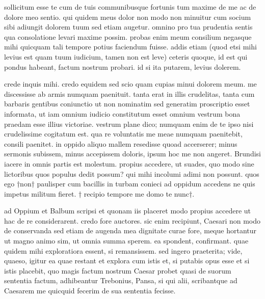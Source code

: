 


 sollicitum esse te cum de tuis communibusque fortunis tum maxime de me ac de dolore meo sentio. qui quidem meus dolor non modo non minuitur cum socium sibi adiungit dolorem tuum sed etiam augetur. omnino pro tua prudentia sentis qua consolatione levari maxime possim. probas enim meum consilium negasque mihi quicquam tali tempore potius faciendum fuisse. addis etiam (quod etsi mihi levius est quam tuum iudicium, tamen non est leve) ceteris quoque, id est qui pondus habeant, factum nostrum probari. id si ita putarem, levius dolerem.

 crede inquis mihi. credo equidem sed scio quam cupias minui dolorem meum. me discessisse ab armis numquam paenituit. tanta erat in illis crudelitas, tanta cum barbaris gentibus coniunctio ut non nominatim sed generatim proscriptio esset informata, ut iam omnium iudicio constitutum esset omnium vestrum bona praedam esse illius victoriae. vestrum plane dico; numquam enim de te ipso nisi crudelissime cogitatum est. qua re voluntatis me meae numquam paenitebit, consili paenitet. in oppido aliquo mallem resedisse quoad accerserer; minus sermonis subissem, minus accepissem doloris, ipsum hoc me non angeret. Brundisi iacere in omnis partis est molestum. propius accedere, ut suades, quo modo sine lictoribus quos populus dedit possum? qui mihi incolumi adimi non possunt. quos ego †non† paulisper cum bacillis in turbam conieci ad oppidum accedens ne quis impetus militum fieret. † recipio tempore me domo te nunc†.

 ad Oppium et Balbum scripsi et quonam iis placeret modo propius accedere ut hac de re considerarent. credo fore auctores. sic enim recipiunt, Caesari non modo de conservanda sed etiam de augenda mea dignitate curae fore, meque hortantur ut magno animo sim, ut omnia summa sperem. ea spondent, confirmant. quae quidem mihi exploratiora essent, si remansissem. sed ingero praeterita; vide, quaeso, igitur ea quae restant et explora cum istis et, si putabis opus esse et si istis placebit, quo magis factum nostrum Caesar probet quasi de suorum sententia factum, adhibeantur Trebonius, Pansa, si qui alii, scribantque ad Caesarem me quicquid fecerim de sua sententia fecisse.

